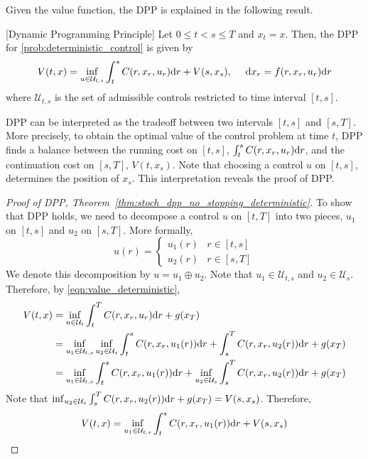 \documentclass[11pt]{book}
\newcommand{\dr}{\text{\normalfont d}r}
\newcommand{\dx}{\text{\normalfont d}x}
\begin{document}
Given the value function, the DPP is explained in the following result.
\begin{thm}\label{thm:stoch_dpp_no_stopping_deterministic}
    [Dynamic Programming Principle]
    Let $0\le t<s\le T$ and $x_t=x$. Then, the DPP for \eqref{prob:deterministic_control} is given by 
    \begin{equation} \label{eqn:dpp_deterministic}
    V(t,x) =\inf_{u\in\mathcal{U}_{t,s}}\int_t^sC(r,x_r,u_r){{\dr}}+V(s,x_s),~~~~{\dx}_r=f(r,x_r,u_r){{\dr}}
\end{equation}
where $\mathcal{U}_{t,s}$ is the set of admissible controls restricted to time interval $[t,s]$.
\end{thm}
DPP can be interpreted as the tradeoff between two intervals $[t,s]$ and $[s,T]$. More precisely, to obtain the optimal value of the control problem at time $t$, DPP finds a balance between the running cost on $[t,s]$, $\int_t^sC(r,x_r,u_r){{\dr}}$, and the continuation cost on $[s,T]$, $V(t,x_s)$. Note that choosing a control $u$ on $[t,s]$, determines the position of $x_s$.
This interpretation reveals the proof of DPP.
\begin{proof}
    [Proof of DPP, Theorem~\ref{thm:stoch_dpp_no_stopping_deterministic}]
    To show that DPP holds, we need to decompose a control $u$ on $[t,T]$ into two pieces, $u_1$ on $[t,s]$ and $u_2$ on $[s,T]$. More formally,
    \[
    u(r) =\begin{cases}
        u_1(r)& r\in[t,s]\\
        u_2(r)& r\in[s,T]
    \end{cases} 
    \]
    We denote this decomposition by $u=u_1\oplus u_2$. Note that $u_1\in\mathcal{U}_{t,s}$ and $u_2\in\mathcal{U}_{s}$.
    Therefore, by \eqref{eqn:value_deterministic},
    \[
    \begin{split}
        V(t,x)&= \inf_{u\in\mathcal{U}_{t}}\int_t^TC(r,x_r,u_r){{\dr}}+g(x_T)\\
        &= \inf_{u_1\in\mathcal{U}_{t,s}}\inf_{u_2\in\mathcal{U}_{s}}\int_t^sC(r,x_r,u_1(r)){{\dr}}+\int_s^TC(r,x_r,u_2(r)){{\dr}}+g(x_T)\\
        &=
        \inf_{u_1\in\mathcal{U}_{t,s}} \int_t^sC(r,x_r,u_1(r)){{\dr}} + \inf_{u_2\in\mathcal{U}_{s}}\int_s^TC(r,x_r,u_2(r)){{\dr}}+g(x_T)\\
    \end{split}
    \]
    Note that $\inf_{u_2\in\mathcal{U}_{s}}\int_s^TC(r,x_r,u_2(r)){{\dr}}+g(x_T)=V(s,x_s)$. Therefore,
     \[
        V(t,x)= 
        \inf_{u_1\in\mathcal{U}_{t,s}} \int_t^sC(r,x_r,u_1(r)){{\dr}} + V(s,x_s)
    \]
\end{proof}
\end{document}
